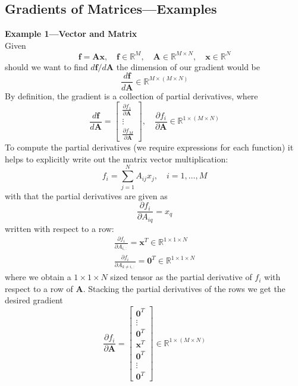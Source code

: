 \documentclass{report}
\begin{document}
\clearpage

\subsection{Gradients of Matrices---Examples}
\textbf{Example 1---Vector and Matrix}\\
Given
\begin{equation*}
\bm{f}=\bm{Ax},\quad\bm{f}\in\mathbb{R}^{M},\quad\bm{A}\in\mathbb{R}^{M\times N},\quad\bm{x}\in\mathbb{R}^{N}
\end{equation*}
should we want to find $d\bm{f}/d\bm{A}$ the dimension of our gradient would be
\begin{equation*}
\frac{d\bm{f}}{d\bm{A}}\in\mathbb{R}^{M\times(M\times N)}
\end{equation*}
By definition, the gradient is a collection of partial derivatives, where
\begin{equation*}
\frac{d\bm{f}}{d\bm{A}}=\begin{bmatrix}
\frac{\partial f_1}{\partial\bm{A}}\\\vdots\\\frac{\partial f_M}{\partial\bm{A}}
\end{bmatrix},\quad\frac{\partial f_i}{\partial\bm{A}}\in\mathbb{R}^
{1\times(M\times N)}
\end{equation*}
To compute the partial derivatives (we require expressions for each function) it helps to explicitly write out
the matrix vector multiplication:
\begin{equation*}
f_i=\sum^{N}_{j=1}A_{ij}x_j,\quad i=1,\ldots,M
\end{equation*}
with that the partial derivatives are given as
\begin{equation*}
\frac{\partial f_i}{\partial A_{iq}}=x_q
\end{equation*}
written with respect to a row:
\begin{align*}
\frac{\partial f_i}{\partial A_{i,:}}=\bm{x}^T\in\mathbb{R}^
{1\times1\times N}\\
\frac{\partial f_i}{\partial A_{k\neq i,:}}=
\bm{0}^T\in\mathbb{R}^{1\times1\times N}
\end{align*}
where we obtain a $1\times1\times N$ sized tensor as the partial derivative of $f_i$ with respect to a row of $\bm{A}$.
Stacking the partial derivatives of the rows we get the desired
gradient
\begin{equation*}
\frac{\partial f_i}{\partial\bm{A}}=\begin{bmatrix}
\bm{0}^T\\\vdots\\\bm{0}^T\\\bm{x}^T\\\bm{0}^T\\\vdots\\\bm{0}^T
\end{bmatrix}\in\mathbb{R}^{1\times(M\times N)}
\end{equation*}
\end{document}
